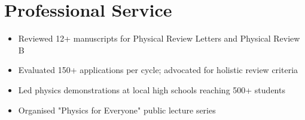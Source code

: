 \section{Professional Service}

\begin{itemize}
  \item Reviewed 12+ manuscripts for Physical Review Letters and Physical Review B
\end{itemize}

\begin{itemize}
  \item Evaluated 150+ applications per cycle; advocated for holistic review criteria
\end{itemize}

\begin{itemize}
  \item Led physics demonstrations at local high schools reaching 500+ students
  \item Organised "Physics for Everyone" public lecture series
\end{itemize}

